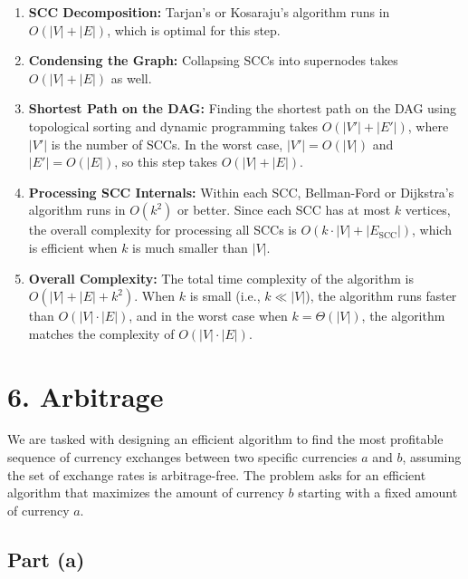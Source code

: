 \documentclass[11pt]{article}
\begin{document}
\begin{enumerate}
    \item \textbf{SCC Decomposition:} Tarjan’s or Kosaraju’s algorithm runs in \( O(|V| + |E|) \), which is optimal for this step.
    
    \item \textbf{Condensing the Graph:} Collapsing SCCs into supernodes takes \( O(|V| + |E|) \) as well.
    
    \item \textbf{Shortest Path on the DAG:} Finding the shortest path on the DAG using topological sorting and dynamic programming takes \( O(|V'| + |E'|) \), where \( |V'| \) is the number of SCCs. In the worst case, \( |V'| = O(|V|) \) and \( |E'| = O(|E|) \), so this step takes \( O(|V| + |E|) \).
    
    \item \textbf{Processing SCC Internals:} Within each SCC, Bellman-Ford or Dijkstra’s algorithm runs in \( O(k^2) \) or better. Since each SCC has at most \( k \) vertices, the overall complexity for processing all SCCs is \( O(k \cdot |V| + |E_{\text{SCC}}|) \), which is efficient when \( k \) is much smaller than \( |V| \).
    
    \item \textbf{Overall Complexity:} The total time complexity of the algorithm is \( O(|V| + |E| + k^2) \). When \( k \) is small (i.e., \( k \ll |V| \)), the algorithm runs faster than \( O(|V| \cdot |E|) \), and in the worst case when \( k = \Theta(|V|) \), the algorithm matches the complexity of \( O(|V| \cdot |E|) \).
\end{enumerate}

\newpage

\section*{6. Arbitrage}

We are tasked with designing an efficient algorithm to find the most profitable sequence of currency exchanges between two specific currencies \( a \) and \( b \), assuming the set of exchange rates is arbitrage-free. The problem asks for an efficient algorithm that maximizes the amount of currency \( b \) starting with a fixed amount of currency \( a \).

\subsection*{Part (a)}
\end{document}
